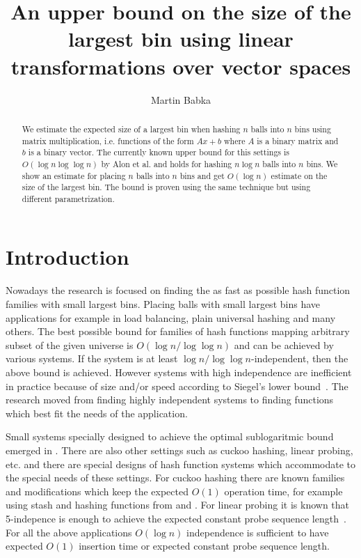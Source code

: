 \documentclass{article}
\title{An upper bound on the size of the largest bin using linear transformations over vector spaces}
\author{Martin Babka}
\begin{document}
\maketitle

\begin{abstract}
We estimate the expected size of a largest bin when hashing $n$ balls into $n$ bins using matrix multiplication, i.e. functions of the form $Ax + b$ where $A$ is a binary matrix and $b$ is a binary vector.
The currently known upper bound for this settings is $O(\log n \log \log n)$ by Alon et al. and holds for hashing $n \log n$ balls into $n$ bins.
We show an estimate for placing $n$ balls into $n$ bins and get $O(\log n)$ estimate on the size of the largest bin.
The bound is proven using the same technique but using different parametrization.
\end{abstract}

\section{Introduction}

Nowadays the research is focused on finding the as fast as possible hash function families with small largest bins.
Placing balls with small largest bins have applications for example in load balancing, plain universal hashing and many others.
The best possible bound for families of hash functions mapping arbitrary subset of the given universe is $O(\log n/\log \log n)$ and can be achieved by various systems.
If the system is at least $\log n/\log \log n$-independent, then the above bound is achieved.
However systems with high independence are inefficient in practice because of size and/or speed according to Siegel's lower bound~\cite{siegel}. 
The research moved from finding highly independent systems to finding functions which best fit the needs of the application. 

Small systems specially designed to achieve the optimal sublogaritmic bound emerged in \cite{celisetal}.
There are also other settings such as cuckoo hashing, linear probing, etc. and there are special designs of hash function systems which accommodate to the special needs of these settings.
For cuckoo hashing there are known families and modifications which keep the expected $O(1)$ operation time, for example using stash and hashing functions from \cite{mitzenmacher-cuckoo} and \cite{dietzfelbinger-cuckoo}.
For linear probing it is known that 5-indepence is enough to achieve the expected constant probe sequence length~\cite{linear-probing}.
For all the above applications $O(\log n)$ independence is sufficient to have expected $O(1)$ insertion time or expected constant probe sequence length.
\end{document}
